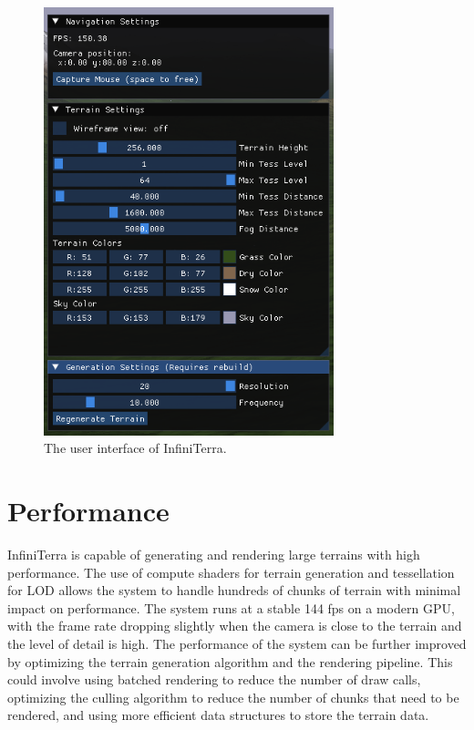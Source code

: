 \documentclass{article}
\begin{document}
\begin{figure}[H]
	\centering
	\includegraphics[width=0.75\textwidth]{img/interface.png}
	\caption{The user interface of InfiniTerra.}
	\label{fig:interface}
\end{figure}

\section{Performance}
\label{ch:performance}


InfiniTerra is capable of generating and rendering large terrains with high performance. The use of
compute shaders for terrain generation and tessellation for LOD allows the system to handle
hundreds of chunks of terrain with minimal impact on performance. The system runs at a stable 144
fps on a modern GPU, with the frame rate dropping slightly when the camera is close to the terrain
and the level of detail is high. The performance of the system can be further improved by
optimizing the terrain generation algorithm and the rendering pipeline. This could involve using
batched rendering to reduce the number of draw calls, optimizing the culling algorithm to reduce
the number of chunks that need to be rendered, and using more efficient data structures to store
the terrain data.
\end{document}
